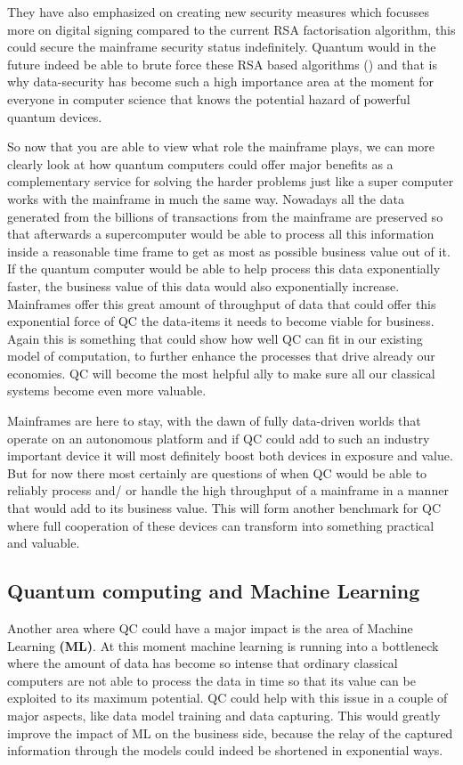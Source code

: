 They have also emphasized on creating new security measures which focusses more on digital signing compared to the current RSA factorisation algorithm, this could secure the mainframe security status indefinitely. Quantum would in the future indeed be able to brute force these RSA based algorithms (\textcite{Shor2000}) and that is why data-security has become such a high importance area at the moment for everyone in computer science that knows the potential hazard of powerful quantum devices.

So now that you are able to view what role the mainframe plays, we can more clearly look at how quantum computers could offer major benefits as a complementary service for solving the harder problems just like a super computer works with the mainframe in much the same way. Nowadays all the data generated from the billions of transactions from the mainframe are preserved so that afterwards a supercomputer would be able to process all this information inside a reasonable time frame to get as most as possible business value out of it. If the quantum computer would be able to help process this data exponentially faster, the business value of this data would also exponentially increase. Mainframes offer this great amount of throughput of data that could offer this exponential force of QC the data-items it needs to become viable for business. Again this is something that could show how well QC can fit in our existing model of computation, to further enhance the processes that drive already our economies. QC will become the most helpful ally to make sure all our classical systems become even more valuable.

Mainframes are here to stay, with the dawn of fully data-driven worlds that operate on an autonomous platform and if QC could add to such an industry important device it will most definitely boost both devices in exposure and value. But for now there most certainly are questions of when QC would be able to reliably process and/ or handle the high throughput of a mainframe in a manner that would add to its business value. This will form another benchmark for QC where full cooperation of these devices can transform into something practical and valuable.




\subsection{Quantum computing and Machine Learning}

Another area where QC could have a major impact is the area of Machine Learning \textbf{(ML)}. At this moment machine learning is running into a bottleneck where the amount of data has become so intense that ordinary classical computers are not able to process the data in time so that its value can be exploited to its maximum potential. QC could help with this issue in a couple of major aspects, like data model training and data capturing. This would greatly improve the impact of ML on the business side, because the relay of the captured information through the models could indeed be shortened in exponential ways. \autocite{Biamonte2017}

